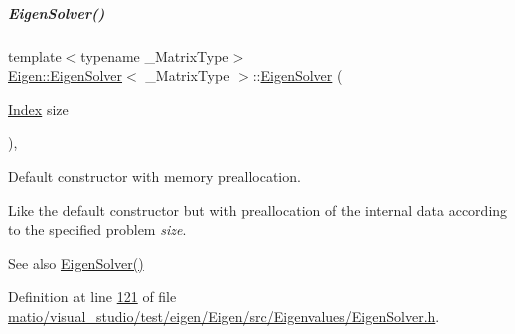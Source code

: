\mbox{\label{group___eigenvalues___module_aa4edf56ecc178b277b75c13a2ca1089f}} 
\subparagraph{\texorpdfstring{Eigen\+Solver()}{EigenSolver()}\hspace{0.1cm}{\footnotesize\ttfamily [5/6]}}
{\footnotesize\ttfamily template$<$typename \+\_\+\+Matrix\+Type$>$ \\
\hyperlink{group___eigenvalues___module_class_eigen_1_1_eigen_solver}{Eigen\+::\+Eigen\+Solver}$<$ \+\_\+\+Matrix\+Type $>$\+::\hyperlink{group___eigenvalues___module_class_eigen_1_1_eigen_solver}{Eigen\+Solver} (\begin{DoxyParamCaption}\item[{\hyperlink{group___eigenvalues___module_a5bff6a6bc0efac67d52c60c2c3deb9ee}{Index}}]{size }\end{DoxyParamCaption})\hspace{0.3cm}{\ttfamily [inline]}, {\ttfamily [explicit]}}



Default constructor with memory preallocation. 

Like the default constructor but with preallocation of the internal data according to the specified problem {\itshape size}. \begin{DoxySeeAlso}{See also}
\hyperlink{group___eigenvalues___module_a3af22d721a6401365881b2ef252d26aa}{Eigen\+Solver()} 
\end{DoxySeeAlso}


Definition at line \hyperlink{matio_2visual__studio_2test_2eigen_2_eigen_2src_2_eigenvalues_2_eigen_solver_8h_source_l00121}{121} of file \hyperlink{matio_2visual__studio_2test_2eigen_2_eigen_2src_2_eigenvalues_2_eigen_solver_8h_source}{matio/visual\+\_\+studio/test/eigen/\+Eigen/src/\+Eigenvalues/\+Eigen\+Solver.\+h}.

